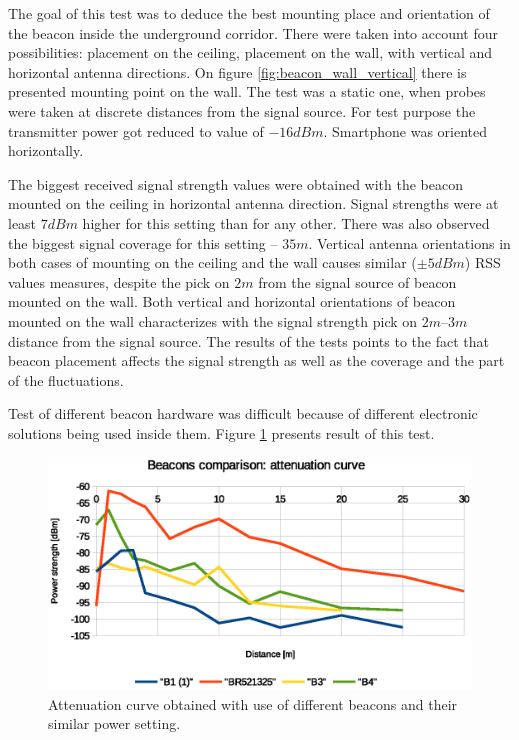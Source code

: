 \documentclass[../main.tex]{subfiles}
\begin{document}
The goal of this test was to deduce the best mounting place and orientation of the beacon inside the underground corridor. There were taken into account four possibilities: placement on the ceiling, placement on the wall, with vertical and horizontal antenna directions. On figure \ref{fig:beacon_wall_vertical} there is presented mounting point on the wall. The test was a static one, when probes were taken at discrete distances from the signal source. For test purpose the transmitter power got reduced to value of $-16dBm$. Smartphone was oriented horizontally.

The biggest received signal strength values were obtained with the beacon mounted on the ceiling in horizontal antenna direction. Signal strengths were at least $7dBm$ higher for this setting than for any other. There was also observed the biggest signal coverage for this setting -- $35m$. Vertical antenna orientations in both cases of mounting on the ceiling and the wall causes similar ($\pm5dBm$) RSS values measures, despite the pick on $2m$ from the signal source of beacon mounted on the wall. Both vertical and horizontal orientations of beacon mounted on the wall characterizes with the signal strength pick on $2m$--$3m$ distance from the signal source. The results of the tests points to the fact that beacon placement affects the signal strength as well as the coverage and the part of the fluctuations.

Test of different beacon hardware was difficult because of different electronic solutions being used inside them. Figure \ref{fig:tests_case8_beacons_comparison} presents result of this test.

\begin{figure}[!htbp]
\includegraphics[width=\textwidth, keepaspectratio]{pictures/tests_case8_beacons_comparison}
\centering
\caption{Attenuation curve obtained with use of different beacons and their similar power setting.}
\label{fig:tests_case8_beacons_comparison}
\end{figure}
\end{document}

